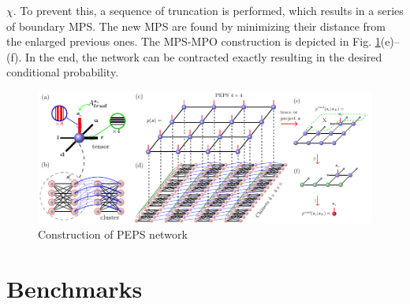 $\chi$. To prevent this, a sequence of truncation is performed, which results
in a series of boundary MPS. The new MPS are found by minimizing their distance
from the enlarged previous ones. The MPS-MPO construction is depicted in Fig.
\ref{fig:tensors}(e)--(f). In the end, the network can be contracted exactly
resulting in the desired conditional probability.
\begin{figure}
  \includegraphics[width=\textwidth]{figures/peps.pdf}
  \caption{Construction of PEPS network} \label{fig:tensors}
\end{figure}

\section{Benchmarks}


